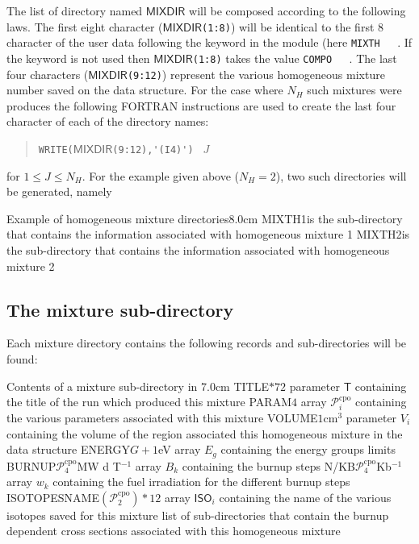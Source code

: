 The list of directory  named $\mathsf{MIXDIR}$ will be composed according to the following
laws. The first eight character ($\mathsf{MIXDIR}$\verb*|(1:8)|) will be identical to the first 8 character
of the user data following the keyword  in the  module (here \verb*|MIXTH   |. If the
keyword  is not used then $\mathsf{MIXDIR}$\verb*|(1:8)| takes the value \verb*|COMPO   |. The last
four characters   ($\mathsf{MIXDIR}$\verb*|(9:12)|) represent the various homogeneous mixture number saved on
the  data structure. For the case where $N_{H}$ such mixtures were produces the following
FORTRAN instructions are used to create the last four character of each of the directory names:
\begin{quote}
\verb|WRITE(|$\mathsf{MIXDIR}$\verb|(9:12),'(I4)') | $J$
\end{quote} 
  for $1\leq J \leq N_{H}$. For the example given above ($N_{H}=2$), two such directories will be
generated, namely

\begin{DescriptionEnregistrement}{Example of homogeneous mixture directories}{8.0cm}
\DirEnr
  {MIXTH1}{is the sub-directory that contains the information associated with
   homogeneous mixture 1}
\DirEnr
  {MIXTH2}{is the sub-directory that contains the information associated with
   homogeneous mixture 2}
\end{DescriptionEnregistrement}

\subsection{The mixture sub-directory}\label{sect:cpodirmixture}

Each mixture directory contains the following records and sub-directories will be found:

\begin{DescriptionEnregistrement}{Contents of a mixture sub-directory in }{7.0cm}
\CharEnr
  {TITLE}{$*72$}
  {parameter $\mathsf{T}$ containing the title of the run which produced this mixture}
\IntEnr
  {PARAM}{$4$}
  {array $\mathcal{P}^{\text{cpo}}_{i}$ containing the various parameters associated with this mixture}
\RealEnr
  {VOLUME}{$1$}{cm$^{3}$}
  {parameter $V_{i}$ containing the volume of the region associated this homogeneous mixture in
   the  data structure}
\RealEnr
  {ENERGY}{$G+1$}{eV}
  {array $E_{g}$ containing the energy groups limits}
\RealEnr
  {BURNUP}{$\mathcal{P}^{\text{cpo}}_{4}$}{MW d T$^{-1}$}
  {array $B_{k}$ containing the burnup steps}
\RealEnr
  {N/KB}{$\mathcal{P}^{\text{cpo}}_{4}$}{Kb$^{-1}$}
  {array $w_{k}$ containing the fuel irradiation for the different burnup steps}
\CharEnr
  {ISOTOPESNAME}{$(\mathcal{P}^{\text{cpo}}_{2})*12$}
  {array  $\mathsf{ISO}_{i}$ containing the name of the various isotopes saved for this mixture}
\DirVar
  {}
  {list of sub-directories that contain the burnup dependent cross sections associated
   with this homogeneous mixture}
\end{DescriptionEnregistrement}

